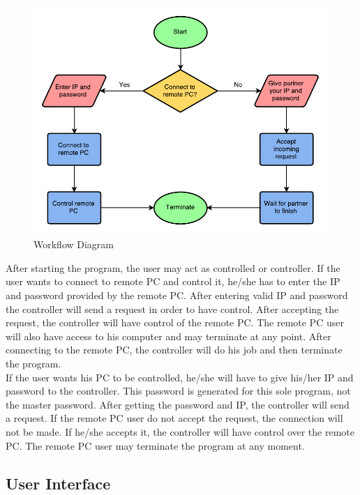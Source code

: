 \documentclass[12pt, a4paper]{article}
\begin{document}
\begin{figure}[h!]
\centering
\includegraphics[scale=0.9]{remote-pc-controller-workflow}
\caption{Workflow Diagram}
\end{figure}

After starting the program, the user may act as controlled or controller. If the user wants to connect to remote PC and control it, he/she has to enter the IP and password provided by the remote PC. After entering valid IP and password the controller will send a request in order to have control. After accepting the request, the controller will have control of the remote PC. The remote PC user will also have access to his computer and may terminate at any point. After connecting to the remote PC, the controller will do his job and then terminate the program. \\
If the user wants his PC to be controlled, he/she will have to give his/her IP and password to the controller. This password is generated for this sole program, not the master password. After getting the password and IP, the controller will send a request. If the remote PC user do not accept the request, the connection will not be made. If he/she accepts it, the controller will have control over the remote PC. The remote PC user may terminate the program at any moment.

\newpage

\subsection{User Interface}
\end{document}
